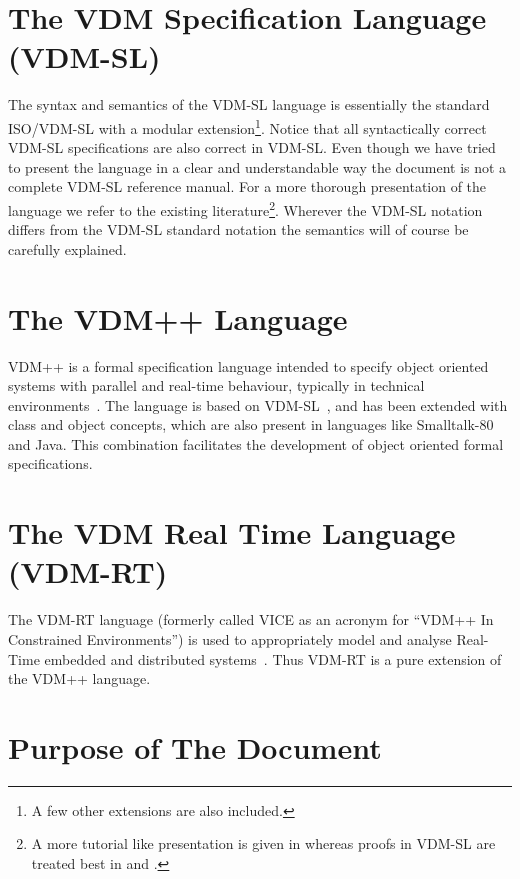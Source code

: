 \documentclass{overturerepchap}
\begin{document}
\section{The VDM Specification Language (VDM-SL)}

The syntax and semantics of the VDM-SL
language is essentially the standard ISO/VDM-SL \cite{ISOVDM96}
with a modular extension\footnote{A few other extensions are also included.}.
Notice that all syntactically correct VDM-SL specifications are also correct in
 VDM-SL. 
Even though we have tried to present the language in a
clear and understandable way the document is not a complete VDM-SL
reference manual. 
For a more thorough presentation of the language we refer to the
existing literature\footnote{A more tutorial like
presentation is given in \cite{Fitzgerald&98} whereas proofs in VDM-SL
are treated best in \cite{Jones90a} and \cite{Bicarregui&94}.}.
Wherever the  VDM-SL notation differs from
the VDM-SL standard notation the semantics will of course be carefully
explained.

\section{The VDM++ Language}

VDM++ is a formal specification language intended to specify object
oriented systems with parallel and real-time behaviour, typically in
technical environments~\cite{Fitzgerald&05}.  The language is based on
VDM-SL~\cite{ISOVDM96}, and has been extended with class and object
concepts, which are also present in languages like Smalltalk-80 and
Java.  This combination facilitates the development of object oriented
formal specifications.

\section{The VDM Real Time Language (VDM-RT)}

The VDM-RT language (formerly called VICE as an acronym for ``VDM++ In
Constrained Environments'') is used to appropriately model and analyse
Real-Time embedded and distributed
systems~\cite{Mukherjee&00,Verhoef&06b,Verhoef&07,Verhoef08,Larsen&09b}. Thus
VDM-RT is a pure extension of the VDM++ language.


\section{Purpose of The Document}
\end{document}

